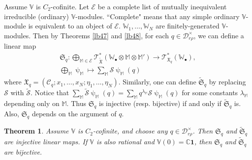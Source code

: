 \documentclass[12pt,a4paper,notitlepage]{article}
\theoremstyle{definition}
\theoremstyle{plain}
\newtheorem{thm}[df]{Theorem}
\newcommand{\fk}{\mathfrak}
\newcommand{\mc}{\mathcal}
\newcommand{\wtd}{\widetilde}
\newcommand{\id}{\mathbf{1}}
\newcommand{\scr}{\mathscr}
\newcommand{\blt}{\bullet}
\newcommand{\Vbb}{\mathbb V}
\newcommand{\Wbb}{\mathbb W}
\newcommand{\Mbb}{\mathbb M}
\newcommand{\Cbb}{\mathbb C}
\numberwithin{equation}{section}
\begin{document}
Assume $\Vbb$ is $C_2$-cofinite. Let $\mc E$ be a complete list of mutually inequivalent irreducible (ordinary)   $\Vbb$-modules. ``Complete" means that any simple ordinary $\Vbb$-module is equivalent to an object of $\mc E$. $\Wbb_1,\dots,\Wbb_N$ are finitely-generated $\Vbb$-modules. Then by Theorems \ref{lb47} and \ref{lb48}, for each $q\in\mc D_{r\rho}^\times$, we can define a \index{Sq@$\fk S_q,\wtd{\fk S}_q$} linear map
\begin{gather}
\fk S_q:\bigoplus_{\Mbb\in\mc E}\scr T_{\wtd{\fk X}}^*(\Wbb_\blt\otimes\Mbb\otimes\Mbb')\rightarrow\scr T_{\fk X_q}^*(\Wbb_\blt),\label{eq92}\\
\bigoplus_\Mbb\uppsi_\Mbb\mapsto \sum_\Mbb\mc S\uppsi_\Mbb(q)\nonumber
\end{gather}
where $\fk X_q=(\mc C_q;x_1,\dots,x_N;\eta_1,\dots,\eta_N)$. Similarly, one can define $\wtd{\fk S}_q$ by replacing $\mc S$ with $\wtd{\mc S}$. Notice that $\sum_\Mbb\wtd{\mc S}\uppsi_\Mbb(q)=\sum_\Mbb q^{\lambda_\Mbb}\mc S\uppsi_\Mbb(q)$ for some constants $\lambda_\Mbb$ depending only on $\Mbb$. Thus $\fk S_q$ is injective (resp. bijective) if and only if $\wtd{\fk S}_q$ is. Also, $\fk S_q$ depends on the argument of $q$.


\begin{thm}\label{lb49}
Assume $\Vbb$ is $C_2$-cofinite, and choose any $q\in\mc D_{r\rho}^\times$. Then $\fk S_q$ and $\wtd{\fk S}_q$ are injective linear maps. If $\Vbb$ is also rational and $\Vbb(0)=\Cbb\id$, then $\fk S_q$ and $\wtd{\fk S}_q$ are bijective.
\end{thm}
\end{document}
